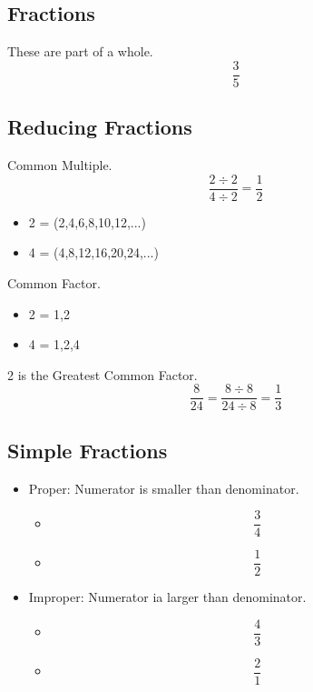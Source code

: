 \documentclass[]{article}
\begin{document}
\subsection{Fractions}
These are part of a whole.
\begin{equation}
	\frac {3}{5} 
\end{equation}

\subsection{Reducing Fractions}
Common Multiple.
\begin{equation}
	\frac {2 \div 2}{4 \div 2} = \frac{1}{2}
\end{equation}
	\begin{itemize}
		\item 2 = (2,4,6,8,10,12,...)
		\item 4 = (4,8,12,16,20,24,...)
	\end{itemize}
Common Factor.
	\begin{itemize}
		\item 2 = 1,2
		\item 4 = 1,2,4
	\end{itemize}
		2 is the Greatest Common Factor.
\begin{equation}
\frac {8}{24} = \frac {8 \div 8}{24 \div 8} = \frac {1}{3}
\end{equation}

\subsection{Simple Fractions}
\begin{itemize}
	\item Proper: Numerator is smaller than denominator. 
	\begin{itemize}
		\item \begin{equation}
			\frac{3}{4} 
		\end{equation}
		\item \begin{equation}
			\frac{1}{2}
		\end{equation}
	\end{itemize}
	\item Improper: Numerator ia larger than denominator. 
		\begin{itemize}
			\item \begin{equation}
			\frac{4}{3} 
			\end{equation}
			\item \begin{equation}
			\frac{2}{1}
			\end{equation}
		\end{itemize}
\end{itemize}
\end{document}

